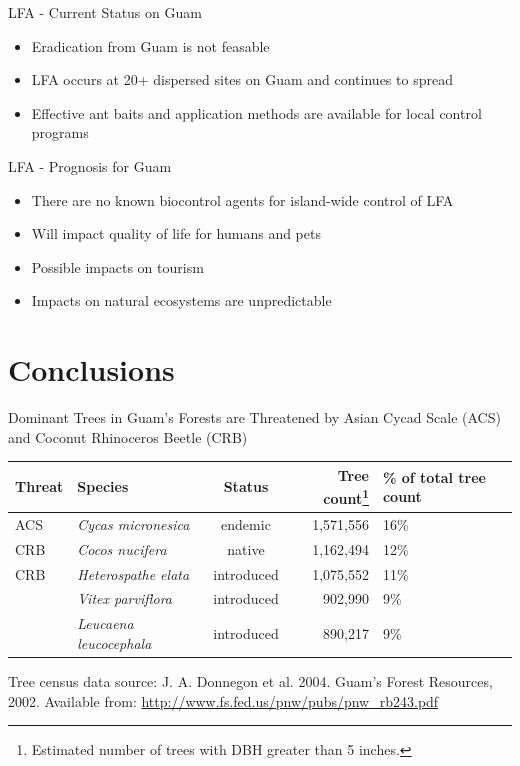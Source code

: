 \documentclass[]{beamer}
\begin{document}
\begin{frame}{LFA - Current Status on Guam}
	\begin{itemize}
		\item Eradication from Guam is not feasable
		\item LFA occurs at 20+ dispersed sites on Guam and continues to spread
		\item Effective ant baits and application methods are available for local control programs
	\end{itemize}
\end{frame}

\begin{frame}{LFA - Prognosis for Guam}
	\begin{itemize}
		\item There are no known biocontrol agents for island-wide control of LFA
		\item Will impact quality of life for humans and pets
		\item Possible impacts on tourism
		\item Impacts on natural ecosystems are unpredictable
	\end{itemize}
\end{frame}

\section*{Conclusions}

\begin{frame}{Dominant Trees in Guam's Forests are Threatened by Asian Cycad Scale (ACS) and Coconut Rhinoceros Beetle (CRB)}
	\begin{center}
		\begin{tabular}{llcrp{0.35in}}
			\hline
			\textbf{Threat} & \textbf{Species} & \textbf{Status} & \textbf{Tree count\footnote{Estimated number of trees with DBH greater than 5 inches.}} & \textbf{\% of total tree count}\\
			\hline
			\rowcolor{yellow}
			ACS & \textit{Cycas micronesica} & endemic & 1,571,556 & 16\% \\ 
			\rowcolor{yellow}
			CRB & \textit{Cocos nucifera} & native & 1,162,494 & 12\% \\ 
			\rowcolor{yellow}
			CRB & \textit{Heterospathe elata} & introduced & 1,075,552 & 11\% \\ 
			
			\hline
			& \textit{Vitex parviflora} & introduced & 902,990 & 9\% \\ 
			& \textit{Leucaena leucocephala} & introduced & 890,217 & 9\%\\
			\hline
		\end{tabular} 
	\end{center}
	Tree census data source: J. A. Donnegon et al. 2004. Guam’s Forest Resources, 2002. Available from: \url{http://www.fs.fed.us/pnw/pubs/pnw_rb243.pdf}	
\end{frame}
\end{document}
